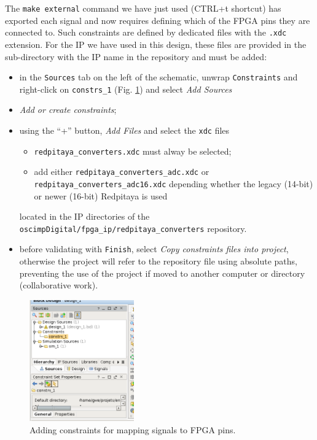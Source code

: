 \documentclass[10pt,oneside]{article}
\begin{document}
The {\tt make external} command we have just used (CTRL+t shortcut) has exported
each signal and now requires defining which of the FPGA pins they are connected to.
Such constraints are defined by dedicated files with the {\tt .xdc} extension. For the
IP we have used in this design, these files are provided in the sub-directory with the
IP name in the repository and must be added:
\begin{itemize}
\item in the {\tt Sources} tab on the left of the schematic, unwrap {\tt Constraints} 
and right-click on {\tt constrs\_1} (Fig. \ref{addSources}) and select {\em Add Sources}
\item {\em Add or create constraints};
\item using the ``+'' button, {\em Add Files} and select the {\tt xdc} files
	\begin{itemize}
\item {\tt redpitaya\_converters.xdc} must alway be selected;
\item add either {\tt redpitaya\_converters\_adc.xdc} or {\tt redpitaya\_converters\_adc16.xdc} 
depending whether the legacy (14-bit) or newer (16-bit) Redpitaya is used 
	\end{itemize}
located in the IP directories of the {\tt oscimpDigital/fpga\_ip/redpitaya\_converters} repository.
\item before validating with {\tt Finish}, select {\em Copy constraints
files into project}, otherwise the project will refer to the repository file
using absolute paths, preventing the use of the project if moved to another
computer or directory (collaborative work).
\end{itemize}

\begin{figure}[h!tb]
\begin{center}
\includegraphics[width=0.4\textwidth]{addSources}
\end{center}
\caption{Adding constraints for mapping signals to FPGA pins.}
\label{addSources}
\end{figure}
\end{document}
